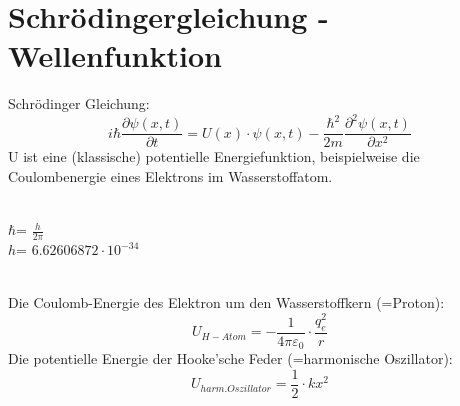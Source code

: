  \section{Schrödingergleichung - Wellenfunktion}
 Schrödinger Gleichung:
 \[
 		i\hbar \dfrac{\partial\psi(x,t)}{\partial t}=
 		U(x)\cdot\psi(x,t)-\frac{\hbar^2}{2m}\frac{\partial^2\psi(x,t)}{\partial x^2}
 \]
 U ist eine (klassische) potentielle Energiefunktion, beispielweise die Coulombenergie eines Elektrons im Wasserstoffatom.\\
 \\
 \begin{footnotesize}
  	$\hbar$=	$\frac{h}{2\pi}$\\
  	$h$= $6.62606872\cdot 10^{-34}$\\
  \end{footnotesize}
  \
  \\
  Die Coulomb-Energie des Elektron um den Wasserstoffkern (=Proton):
  \[
  		U_{H-Atom}=-\frac{1}{4\pi\varepsilon_0}\cdot\frac{q_e^2}{r}
  \]
  Die potentielle Energie der Hooke'sche Feder (=harmonische Oszillator):
  \[
  		U_{harm. Oszillator}=\frac{1}{2}\cdot kx^2
  \]
  \\
